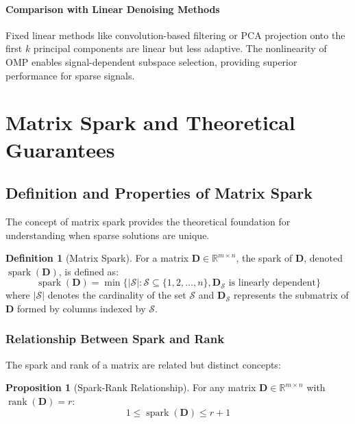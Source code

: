 \documentclass[12pt]{article}
\DeclareMathOperator{\spark}{spark}
\DeclareMathOperator{\rank}{rank}
\newcommand{\Real}{\mathbb{R}}
\theoremstyle{definition}
\newtheorem{proposition}[theorem]{Proposition}
\newtheorem{definition}[theorem]{Definition}
\begin{document}
\paragraph{Comparison with Linear Denoising Methods}
Fixed linear methods like convolution-based filtering or PCA projection onto the first $k$ principal components are linear but less adaptive. The nonlinearity of OMP enables signal-dependent subspace selection, providing superior performance for sparse signals.

\newpage

\section{Matrix Spark and Theoretical Guarantees}

\subsection{Definition and Properties of Matrix Spark}

The concept of matrix spark provides the theoretical foundation for understanding when sparse solutions are unique.

\begin{definition}[Matrix Spark]
    \label{def:spark}
    For a matrix $\mathbf{D} \in \Real^{m \times n}$, the spark of $\mathbf{D}$, denoted $\spark(\mathbf{D})$, is defined as:
    \begin{equation}
        \spark(\mathbf{D}) = \min\{|\mathcal{S}| : \mathcal{S} \subseteq \{1, 2, \ldots, n\}, \mathbf{D}_{\mathcal{S}} \text{ is linearly dependent}\}
    \end{equation}
    where $|\mathcal{S}|$ denotes the cardinality of the set $\mathcal{S}$ and $\mathbf{D}_{\mathcal{S}}$ represents the submatrix of $\mathbf{D}$ formed by columns indexed by $\mathcal{S}$.
\end{definition}

\subsubsection{Relationship Between Spark and Rank}

The spark and rank of a matrix are related but distinct concepts:

\begin{proposition}[Spark-Rank Relationship]
    \label{prop:spark_rank}
    For any matrix $\mathbf{D} \in \Real^{m \times n}$ with $\rank(\mathbf{D}) = r$:
    \begin{equation}
        1 \leq \spark(\mathbf{D}) \leq r + 1
    \end{equation}
\end{proposition}
\end{document}

